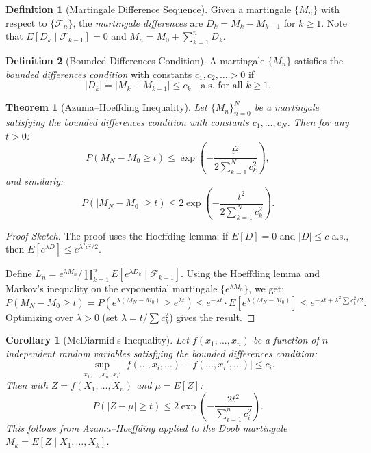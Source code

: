 \documentclass[12pt, a4paper]{article}
\theoremstyle{definition}
\newtheorem{definition}{Definition}[section]
\theoremstyle{plain}
\newtheorem{theorem}{Theorem}[section]
\newtheorem{corollary}{Corollary}[section]
\begin{document}
\begin{definition}[Martingale Difference Sequence]
Given a martingale $\{M_n\}$ with respect to $\{\mathcal{F}_n\}$, the \emph{martingale differences} are $D_k = M_k - M_{k-1}$ for $k \geq 1$. Note that $E[D_k \mid \mathcal{F}_{k-1}] = 0$ and $M_n = M_0 + \sum_{k=1}^n D_k$.
\end{definition}

\begin{definition}[Bounded Differences Condition]
A martingale $\{M_n\}$ satisfies the \emph{bounded differences condition} with constants $c_1, c_2, \ldots > 0$ if
\[
  |D_k| = |M_k - M_{k-1}| \leq c_k \quad \text{a.s.\ for all } k \geq 1.
\]
\end{definition}

\begin{theorem}[Azuma--Hoeffding Inequality]
Let $\{M_n\}_{n=0}^N$ be a martingale satisfying the bounded differences condition with constants $c_1, \ldots, c_N$. Then for any $t > 0$:
\[
  P(M_N - M_0 \geq t) \leq \exp\!\left(-\frac{t^2}{2 \sum_{k=1}^N c_k^2}\right),
\]
and similarly:
\[
  P(|M_N - M_0| \geq t) \leq 2\exp\!\left(-\frac{t^2}{2 \sum_{k=1}^N c_k^2}\right).
\]
\end{theorem}

\begin{proof}[Proof Sketch]
The proof uses the Hoeffding lemma: if $E[D] = 0$ and $|D| \leq c$ a.s., then $E[e^{\lambda D}] \leq e^{\lambda^2 c^2 / 2}$.

Define $L_n = e^{\lambda M_n} / \prod_{k=1}^n E[e^{\lambda D_k} \mid \mathcal{F}_{k-1}]$. Using the Hoeffding lemma and Markov's inequality on the exponential martingale $\{e^{\lambda M_n}\}$, we get:
\[
  P(M_N - M_0 \geq t) = P\!\left(e^{\lambda(M_N - M_0)} \geq e^{\lambda t}\right) \leq e^{-\lambda t} \cdot E[e^{\lambda(M_N - M_0)}] \leq e^{-\lambda t + \lambda^2 \sum c_k^2 / 2}.
\]
Optimizing over $\lambda > 0$ (set $\lambda = t / \sum c_k^2$) gives the result.
\end{proof}

\begin{corollary}[McDiarmid's Inequality]
Let $f(x_1, \ldots, x_n)$ be a function of $n$ independent random variables satisfying the bounded differences condition:
\[
  \sup_{x_1,\ldots,x_n,\,x_i'} |f(\ldots, x_i, \ldots) - f(\ldots, x_i', \ldots)| \leq c_i.
\]
Then with $Z = f(X_1, \ldots, X_n)$ and $\mu = E[Z]$:
\[
  P(|Z - \mu| \geq t) \leq 2 \exp\!\left(-\frac{2t^2}{\sum_{i=1}^n c_i^2}\right).
\]
This follows from Azuma--Hoeffding applied to the Doob martingale $M_k = E[Z \mid X_1, \ldots, X_k]$.
\end{corollary}
\end{document}
